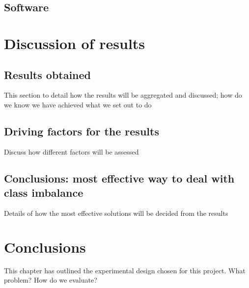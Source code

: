 \subsection{Software}

\section{Discussion of results}
\subsection{Results obtained}
This section to detail how the results will be aggregated and discussed; how do we know we have achieved what we set out to do
\subsection{Driving factors for the results}
Discuss how different factors will be assessed
\subsection{Conclusions: most effective way to deal with class imbalance}
Details of how the most effective solutions will be decided from the results




\section{Conclusions}

This chapter has outlined the experimental design chosen for this project. 
What problem?
How do we evaluate?



